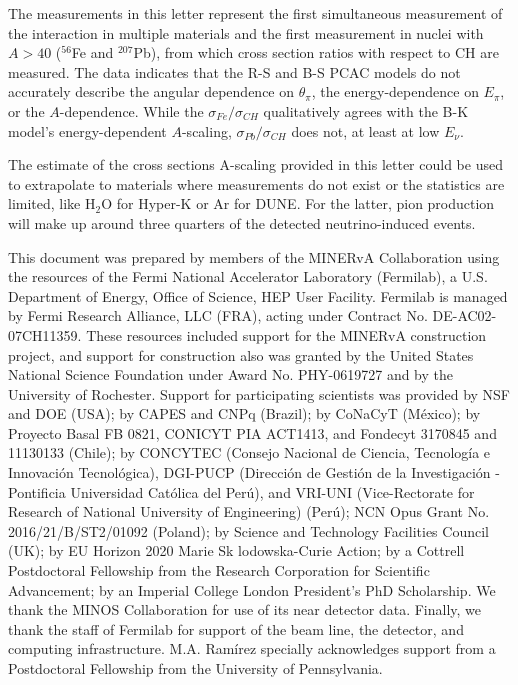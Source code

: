 \documentclass[aps,prl,twocolumn,superscriptaddress,nofootinbib]{revtex4-1}
\begin{document}
\par The measurements in this letter represent the first simultaneous measurement of the interaction in multiple 
materials and the first measurement in nuclei with $A>40$ ($^{56}$Fe and $^{207}$Pb), from which cross section 
ratios with respect to CH are measured. The data indicates that the R-S and B-S PCAC models do not accurately  
describe the angular dependence on $\theta_{\pi}$, the energy-dependence on $E_{\pi}$, or the $A$-dependence.
While the $\sigma_{Fe}/\sigma_{CH}$ qualitatively agrees with the B-K model's energy-dependent $A$-scaling, 
$\sigma_{Pb}/\sigma_{CH}$ does not, at least at low $E_{\nu}$. 
\par The estimate of the cross sections A-scaling provided in this letter could be used to extrapolate to
materials where measurements do not exist or the statistics are limited, like H$_{2}$O for Hyper-K or Ar for
DUNE. For the latter, pion production will make up around three quarters of the detected neutrino-induced
events.

This document was prepared by members of the MINERvA Collaboration using the resources of the Fermi National 
Accelerator Laboratory (Fermilab), a U.S. Department of Energy, Office of Science, HEP User Facility. Fermilab 
is managed by Fermi Research Alliance, LLC (FRA), acting under Contract No. DE-AC02-07CH11359. These resources 
included support for the MINERvA construction project, and support for construction also was granted by the 
United States National Science Foundation under Award No. PHY-0619727 and by the University of Rochester. 
Support for participating scientists was provided by NSF and DOE (USA); by CAPES and CNPq (Brazil); by CoNaCyT 
(M\'{e}xico); by Proyecto Basal FB 0821, CONICYT PIA ACT1413, and Fondecyt 3170845 and 11130133 (Chile); by 
CONCYTEC (Consejo Nacional de Ciencia, Tecnolog\'{i}a e Innovaci\'{o}n Tecnol\'{o}gica), DGI-PUCP (Direcci\'{o}n 
de Gesti\'{o}n de la Investigaci\'{o}n - Pontificia Universidad Cat\'{o}lica del Per\'{u}), and VRI-UNI 
(Vice-Rectorate for Research of National University of Engineering) (Per\'{u}); NCN Opus Grant No. 2016/21/B/ST2/01092
(Poland); by Science and Technology Facilities Council (UK); by EU Horizon 2020 Marie Sk lodowska-Curie Action; 
by a Cottrell Postdoctoral Fellowship from the Research Corporation for Scientific Advancement; by an Imperial 
College London President’s PhD Scholarship. We thank the MINOS Collaboration for use of its near detector data. 
Finally, we thank the staff of Fermilab for support of the beam line, the detector, and computing infrastructure. 
M.A. Ram\'{i}rez specially acknowledges support from a Postdoctoral Fellowship from the University of Pennsylvania.
\end{document}
